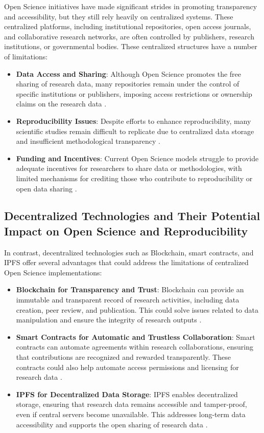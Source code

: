 \documentclass[final]{rc-book-2.14}
\begin{document}
Open Science initiatives have made significant strides in promoting transparency and accessibility, but they still rely heavily on centralized systems. These centralized platforms, including institutional repositories, open access journals, and collaborative research networks, are often controlled by publishers, research institutions, or governmental bodies. These centralized structures have a number of limitations:
\begin{itemize}
    \item \textbf{Data Access and Sharing}: Although Open Science promotes the free sharing of research data, many repositories remain under the control of specific institutions or publishers, imposing access restrictions or ownership claims on the research data \cite{Boulton2015}.
    \item \textbf{Reproducibility Issues}: Despite efforts to enhance reproducibility, many scientific studies remain difficult to replicate due to centralized data storage and insufficient methodological transparency \cite{Borgman2012}.
    \item \textbf{Funding and Incentives}: Current Open Science models struggle to provide adequate incentives for researchers to share data or methodologies, with limited mechanisms for crediting those who contribute to reproducibility or open data sharing \cite{Nosek2015}.
\end{itemize}

\subsection{Decentralized Technologies and Their Potential Impact on Open Science and Reproducibility}
In contrast, decentralized technologies such as Blockchain, smart contracts, and IPFS offer several advantages that could address the limitations of centralized Open Science implementations:
\begin{itemize}
    \item \textbf{Blockchain for Transparency and Trust}: Blockchain can provide an immutable and transparent record of research activities, including data creation, peer review, and publication. This could solve issues related to data manipulation and ensure the integrity of research outputs \cite{Piwowar2011}.
    \item \textbf{Smart Contracts for Automatic and Trustless Collaboration}: Smart contracts can automate agreements within research collaborations, ensuring that contributions are recognized and rewarded transparently. These contracts could also help automate access permissions and licensing for research data \cite{Boulton2015}.
    \item \textbf{IPFS for Decentralized Data Storage}: IPFS enables decentralized storage, ensuring that research data remains accessible and tamper-proof, even if central servers become unavailable. This addresses long-term data accessibility and supports the open sharing of research data \cite{Borgman2012}.
\end{itemize}
\end{document}

